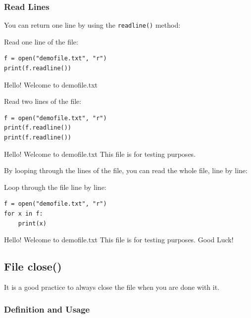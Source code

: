 \documentclass[12pt,a4paper]{article}
\newcommand{\code}[1]{%
	\colorbox{backcolour}{\lstinline{#1}}%
}
\begin{document}
\subsubsection{Read Lines}

You can return one line by using the \code{readline()} method:

\begin{ebox}
Read one line of the file:
	\begin{lstlisting}
f = open("demofile.txt", "r")
print(f.readline())
	\end{lstlisting}
\tcblower
	\begin{vercode}
Hello! Welcome to demofile.txt 
	\end{vercode}
\end{ebox}

\begin{ebox}
Read two lines of the file:
	\begin{lstlisting}
f = open("demofile.txt", "r")
print(f.readline())
print(f.readline())
	\end{lstlisting}
\tcblower
	\begin{vercode}
Hello! Welcome to demofile.txt
This file is for testing purposes.
	\end{vercode}
\end{ebox}

By looping through the lines of the file, you can read the whole file, line by line:

\begin{ebox}
Loop through the file line by line:
	\begin{lstlisting}
f = open("demofile.txt", "r")
for x in f:
    print(x)
	\end{lstlisting}
\tcblower
	\begin{vercode}
Hello! Welcome to demofile.txt
This file is for testing purposes.
Good Luck!
	\end{vercode}
\end{ebox}
\subsection{File close()}

It is a good practice to always close the file when you are done with it.

\subsubsection{Definition and Usage}
\end{document}

